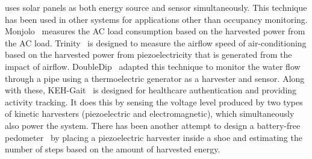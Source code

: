  \sysname uses solar panels as both energy source and sensor simultaneously. This technique has been used in other systems for applications other than occupancy monitoring. Monjolo~\cite{debruin2013monjolo} measures the AC load consumption based on the harvested power from the AC load. Trinity~\cite{xiang2013powering} is designed to measure the airflow speed of air-conditioning based on the harvested power from piezoelectricity that is generated from the impact of airflow. DoubleDip~\cite{martin2012doubledip} adapted this technique to monitor the water flow through a pipe using a thermoelectric generator as a harvester and sensor. Along with these, KEH-Gait~\cite{xu2017keh} is designed for healthcare authentication and providing activity tracking. It does this by sensing the voltage level produced by two types of kinetic harvesters (piezoelectric and electromagnetic), which simultaneously also power the system. There has been another attempt to design a battery-free pedometer~\cite{kalantarian2016pedometers} by placing a piezoelectric harvester inside a shoe and estimating the number of steps based on the amount of harvested energy. 


